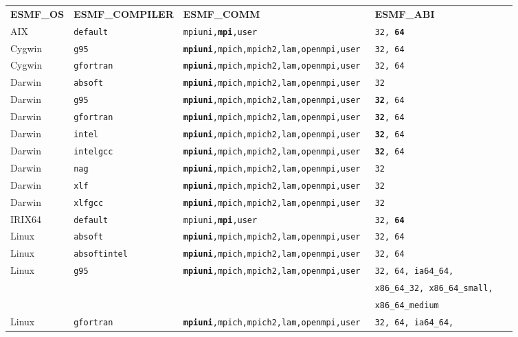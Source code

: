 \vspace{1ex}


\begin{tabular}{lllll}
  {\bfseries\footnotesize ESMF\_OS} &{\bfseries\footnotesize ESMF\_COMPILER} & {\bfseries\footnotesize ESMF\_COMM} & {\bfseries\footnotesize ESMF\_ABI} \\

AIX     &\tt default     &\tt mpiuni,{\bf mpi},user      &\tt 32, {\bf 64} \\
Cygwin  &\tt g95         &\tt {\bf mpiuni},mpich,mpich2,lam,openmpi,user &\tt 32, 64 \\
Cygwin  &\tt gfortran    &\tt {\bf mpiuni},mpich,mpich2,lam,openmpi,user &\tt 32, 64 \\
Darwin  &\tt absoft      &\tt {\bf mpiuni},mpich,mpich2,lam,openmpi,user &\tt 32 \\
Darwin  &\tt g95         &\tt {\bf mpiuni},mpich,mpich2,lam,openmpi,user &\tt {\bf 32}, 64 \\
Darwin  &\tt gfortran    &\tt {\bf mpiuni},mpich,mpich2,lam,openmpi,user &\tt {\bf 32}, 64 \\
Darwin  &\tt intel       &\tt {\bf mpiuni},mpich,mpich2,lam,openmpi,user &\tt {\bf 32}, 64 \\
Darwin  &\tt intelgcc    &\tt {\bf mpiuni},mpich,mpich2,lam,openmpi,user &\tt {\bf 32}, 64 \\
Darwin  &\tt nag         &\tt {\bf mpiuni},mpich,mpich2,lam,openmpi,user &\tt 32 \\
Darwin  &\tt xlf         &\tt {\bf mpiuni},mpich,mpich2,lam,openmpi,user &\tt 32 \\
Darwin  &\tt xlfgcc      &\tt {\bf mpiuni},mpich,mpich2,lam,openmpi,user &\tt 32 \\
IRIX64  &\tt default     &\tt mpiuni,{\bf mpi},user     &\tt 32, {\bf 64} \\
Linux   &\tt absoft      &\tt {\bf mpiuni},mpich,mpich2,lam,openmpi,user &\tt 32, 64 \\
Linux   &\tt absoftintel &\tt {\bf mpiuni},mpich,mpich2,lam,openmpi,user &\tt 32, 64  \\
Linux   &\tt g95         &\tt {\bf mpiuni},mpich,mpich2,lam,openmpi,user &\tt 32, 64, ia64\_64, \\
        &                &                              &\tt x86\_64\_32, x86\_64\_small, \\
        &                &                              &\tt x86\_64\_medium \\
Linux   &\tt gfortran    &\tt {\bf mpiuni},mpich,mpich2,lam,openmpi,user &\tt 32, 64, ia64\_64, \\

\end{tabular}
